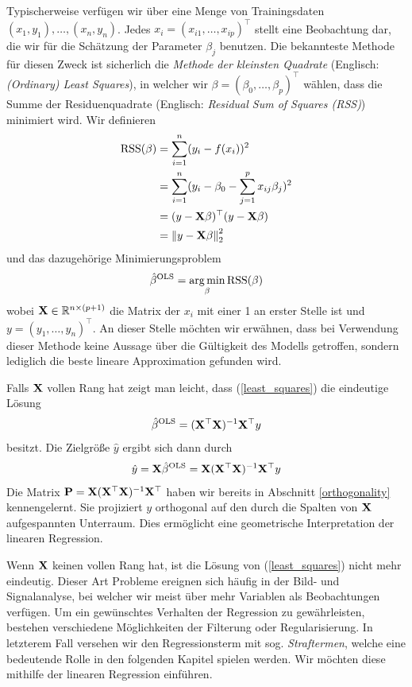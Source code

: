 Typischerweise verfügen wir über eine Menge von Trainingsdaten $(x_1, y_1), \ldots, (x_n, y_n)$. Jedes $x_i = (x_{i1}, \ldots, x_{ip})^{\top}$ stellt eine Beobachtung dar, die wir für die Schätzung der Parameter $\beta_j$ benutzen. Die bekannteste Methode für diesen Zweck ist sicherlich die \textit{Methode der kleinsten Quadrate} (Englisch: \textit{(Ordinary) Least Squares}), in welcher wir $\beta = (\beta_0, \ldots, \beta_p)^{\top}$ wählen, dass die Summe der Residuenquadrate (Englisch: \textit{Residual Sum of Squares (RSS)}) minimiert wird. Wir definieren
\begin{align}
\label{RSS}
\text{RSS}(\beta) & = \sum_{i=1}^{n}(y_i - f(x_i))^2\\
& = \sum_{i=1}^{n}(y_i - \beta_0 - \sum_{j=1}^p x_{ij}\beta_j)^2\nonumber\\
& = (y - \mathbf{X} \beta)^{\top}(y-\mathbf{X} \beta)\nonumber\\
& = \left\lVert y - \mathbf{X} \beta \right\rVert_{2}^{2}\nonumber
\end{align}
und das dazugehörige Minimierungsproblem
\begin{align}
\label{least_squares}
\hat{\beta}^{\text{OLS}} = \operatorname*{arg\,min}_{\beta} \text{RSS}(\beta)
\end{align}
wobei $\mathbf{X} \in \mathbb{R}^{n \times (p+1)}$ die Matrix der $x_i$ mit einer 1 an erster Stelle ist und $y = (y_1, \ldots, y_n)^{\top}$. An dieser Stelle möchten wir erwähnen, dass bei Verwendung dieser Methode keine Aussage über die Gültigkeit des Modells getroffen, sondern lediglich die beste lineare Approximation gefunden wird.

Falls $\mathbf{X}$ vollen Rang hat zeigt man leicht, dass (\ref{least_squares}) die eindeutige Lösung
\begin{align}
\hat{\beta}^{\text{OLS}} = (\mathbf{X}^{\top}\mathbf{X})^{-1}\mathbf{X}^{\top} y
\end{align}
besitzt. Die Zielgröße $\hat{y}$ ergibt sich dann durch
\begin{align}
\hat{y} = \mathbf{X} \hat{\beta}^{\text{OLS}} = \mathbf{X} (\mathbf{X}^{\top}\mathbf{X})^{-1}\mathbf{X}^{\top} y
\end{align}
Die Matrix $\mathbf{P} = \mathbf{X} (\mathbf{X}^{\top}\mathbf{X})^{-1}\mathbf{X}^{\top}$ haben wir bereits in Abschnitt \ref{orthogonality} kennengelernt. Sie projiziert $y$ orthogonal auf den durch die Spalten von $\mathbf{X}$ aufgespannten Unterraum. Dies ermöglicht eine geometrische Interpretation der linearen Regression.

Wenn $\mathbf{X}$ keinen vollen Rang hat, ist die Lösung von (\ref{least_squares}) nicht mehr eindeutig. Dieser Art Probleme ereignen sich häufig in der Bild- und Signalanalyse, bei welcher wir meist über mehr Variablen als Beobachtungen verfügen. Um ein gewünschtes Verhalten der Regression zu gewährleisten, bestehen verschiedene Möglichkeiten der Filterung oder Regularisierung. In letzterem Fall versehen wir den Regressionsterm mit sog. \textit{Straftermen}, welche eine bedeutende Rolle in den folgenden Kapitel spielen werden. Wir möchten diese mithilfe der linearen Regression einführen.

